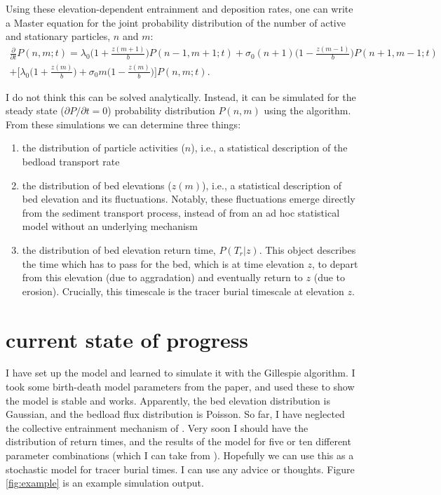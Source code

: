 \documentclass{article}
\begin{document}
Using these elevation-dependent entrainment and deposition rates, one can write a Master equation for the joint probability distribution of the number of active and stationary particles, $n$ and $m$: 
\begin{multline}
 \frac{\partial}{\partial t} P(n,m;t) = \lambda_0 \Big(1+\frac{z(m+1)}{b}\Big) P(n-1,m+1;t) + \sigma_0 (n+1) \Big(1-\frac{z(m-1)}{b}\Big)P(n+1,m-1;t) \\ + \Big[\lambda_0\Big(1+\frac{z(m)}{b} \Big) + \sigma_0 m \Big(1-\frac{z(m)}{b} \Big) \Big] P(n,m;t).
\end{multline}

I do not think this can be solved analytically. 
Instead, it can be simulated for the steady state ($\partial P / \partial t = 0$) probability distribution $P(n,m)$ using the \citet{Gillespie1977} algorithm. 
From these simulations we can determine three things:
\begin{enumerate}
\item the distribution of particle activities ($n$), i.e., a statistical description of the bedload transport rate
\item the distribution of bed elevations ($z(m)$), i.e., a statistical description of bed elevation and its fluctuations. Notably, these fluctuations emerge directly from the sediment transport process, instead of from an ad hoc statistical model without an underlying mechanism \citep[e.g.][]{Martin2014} 
\item the distribution of bed elevation return time, $P(T_r|z)$. This object describes the time which has to pass for the bed, which is at time elevation $z$, to depart from this elevation (due to aggradation) and eventually return to $z$ (due to erosion). 
Crucially, this timescale is the tracer burial timescale at elevation $z$. 
\end{enumerate}
\section{current state of progress}

I have set up the model and learned to simulate it with the Gillespie algorithm. 
I took some birth-death model parameters from the \citet{Ancey2008} paper, and used these to show the model is stable and works. 
Apparently, the bed elevation distribution is Gaussian, and the bedload flux distribution is Poisson. 
So far, I have neglected the collective entrainment mechanism of \citet{Ancey2008}. 
Very soon I should have the distribution of return times, and the results of the model for five or ten different parameter combinations (which I can take from \citet{Ancey2008}). 
Hopefully we can use this as a stochastic model for tracer burial times. 
I can use any advice or thoughts. Figure \ref{fig:example} is an example simulation output. 
\end{document}
